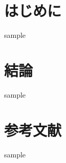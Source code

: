 \documentclass[a4j, 11pt, uplatex]{jsarticle}
\begin{document}
    \maketoc

    \section{はじめに}
    sample

    \section{結論}
    sample

    \section*{参考文献}
    sample
\end{document}
